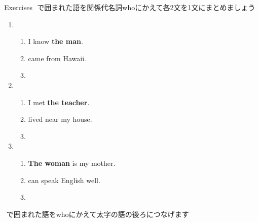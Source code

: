 \documentclass[aspectratio=169,xcolor={dvipsnames,table}]{beamer}
\begin{document}
\begin{frame}[plain]{Exercises}
\fbox{　　}\,\,で囲まれた語を関係代名詞whoにかえて各2文を1文にまとめましょう%
\mbox{}\hfill{\scriptsize {}}
\begin{enumerate}
 \item \begin{enumerate}
	\item I know {\bfseries the man}.
	\item {} came from Hawaii.
	\item {}
       \end{enumerate}
 \item \begin{enumerate}
	\item I met {\bfseries the teacher}.
	\item {} lived near my house.
	\item {}
       \end{enumerate}
 \item \begin{enumerate}
	\item {\bfseries The woman} is my mother.
	\item {} can speak English well.
	\item {}
       \end{enumerate}
\end{enumerate} 

\fbox{　　}\,\,で囲まれた語をwhoにかえて太字の語の後ろにつなげます
\end{frame}
\end{document}

